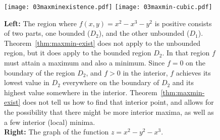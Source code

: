 \begin{figure}[ht]
  \centering
  \texttt{[image: 03maxminexistence.pdf]}\hfill
  \texttt{[image: 03maxmin-cubic.pdf]}
  
  \caption{ \textbf{Left: } The region where $f(x, y) = x^2-x^3-y^2$ is positive
    consists of two parts, one bounded ($D_2$), and the other unbounded ($D_1$).
    Theorem~\ref{thm:maxmin-exist} does not apply to the unbounded region, but
    it does apply to the bounded region $D_2$. In that region $f$ must attain a
    maximum and also a minimum.  Since $f=0$ on the boundary of the region
    $D_2$, and $f>0$ in the interior, $f$ achieves its lowest value in $D_2$
    everywhere on the boundary of $D_2$ and its highest value somewhere in the
    interior.  Theorem~\ref{thm:maxmin-exist} does not tell us how to find that
    interior point, and allows for the possibility that there might be
    more interior maxima, as well as a few interior (local) minima.\\
    \null\qquad \textbf{Right: } The graph of the function $z=x^2-y^2-x^3$.}
  \label{fig:03maxmin-exist-in-fish}
\end{figure}



